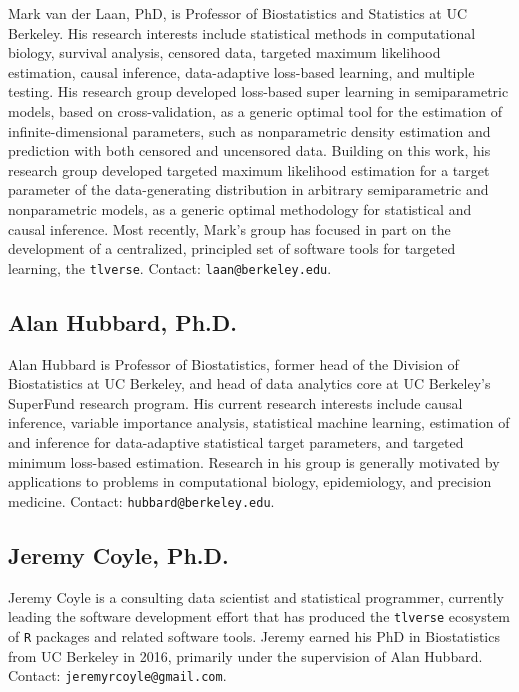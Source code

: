 \documentclass[a4paper,11pt]{texMemo}
\begin{document}
Mark van der Laan, PhD, is Professor of Biostatistics and Statistics at UC
Berkeley. His research interests include statistical methods in computational
biology, survival analysis, censored data, targeted maximum likelihood
estimation, causal inference, data-adaptive loss-based learning, and multiple
testing. His research group developed loss-based super learning in
semiparametric models, based on cross-validation, as a generic optimal tool for
the estimation of infinite-dimensional parameters, such as nonparametric density
estimation and prediction with both censored and uncensored data. Building on
this work, his research group developed targeted maximum likelihood estimation
for a target parameter of the data-generating distribution in arbitrary
semiparametric and nonparametric models, as a generic optimal methodology for
statistical and causal inference. Most recently, Mark's group has focused in
part on the development of a centralized, principled set of software tools for
targeted learning, the \texttt{tlverse}. Contact: \texttt{laan@berkeley.edu}.

\subsection{Alan Hubbard, Ph.D.}

Alan Hubbard is Professor of Biostatistics, former head of the Division of
Biostatistics at UC Berkeley, and head of data analytics core at UC Berkeley's
SuperFund research program. His current research interests include causal
inference, variable importance analysis, statistical machine learning,
estimation of and inference for data-adaptive statistical target parameters, and
targeted minimum loss-based estimation. Research in his group is generally
motivated by applications to problems in computational biology, epidemiology,
and precision medicine. Contact: \texttt{hubbard@berkeley.edu}.

\subsection{Jeremy Coyle, Ph.D.}

Jeremy Coyle is a consulting data scientist and statistical programmer,
currently leading the software development effort that has produced the
\texttt{tlverse} ecosystem of \texttt{R} packages and related software tools.
Jeremy earned his PhD in Biostatistics from UC Berkeley in 2016, primarily under
the supervision of Alan Hubbard. Contact: \texttt{jeremyrcoyle@gmail.com}.
\end{document}
